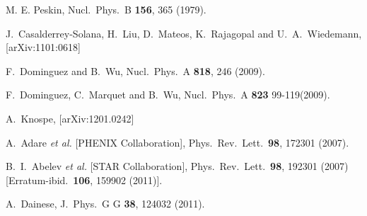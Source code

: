 \documentclass[article,showpacs,preprintnumbers,amsmath,amssymb]{revtex4}
\begin{document}
\begin{thebibliography}{80}
  M. E. Peskin,
  Nucl.\ Phys.\ B {\bf{156}}, 365 (1979). 


  J.~Casalderrey-Solana, H.~Liu, D.~Mateos, K.~Rajagopal and U.~A.~Wiedemann,
  [arXiv:1101:0618]

  F.~Dominguez and B.~Wu,
  Nucl.\ Phys.\ A {\bf 818}, 246 (2009).

  F.~Dominguez, C.~Marquet and B.~Wu,
  Nucl.\ Phys.\ A {\bf{823}} 99-119(2009).

  A.~Knospe,
  [arXiv:1201.0242]

  A.~Adare {\it et al.}  [PHENIX Collaboration],
  Phys.\ Rev.\ Lett.\  {\bf 98}, 172301 (2007).

  B.~I.~Abelev {\it et al.}  [STAR Collaboration],
  Phys.\ Rev.\ Lett.\  {\bf 98}, 192301 (2007)
  [Erratum-ibid.\  {\bf 106}, 159902 (2011)].

  A.~Dainese,
  J.\ Phys.\ G G {\bf 38}, 124032 (2011).


\end{thebibliography}
\end{document}
